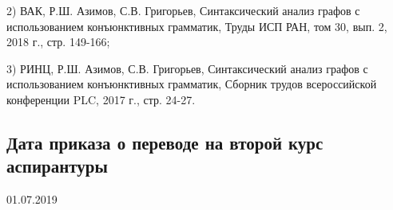 \documentclass[12pt]{article}  %
\theoremstyle{remark}
\begin{document}
2) ВАК, Р.Ш. Азимов, С.В. Григорьев, Синтаксический анализ графов с использованием конъюнктивных грамматик, Труды ИСП РАН, том 30, вып. 2, 2018 г., стр. 149-166;

3) РИНЦ,  Р.Ш. Азимов, С.В. Григорьев, Синтаксический анализ графов с использованием конъюнктивных грамматик, Сборник трудов всероссийской конференции PLC, 2017 г., стр. 24-27.

\subsection{Дата приказа о переводе на второй курс аспирантуры}
01.07.2019
\end{document}
